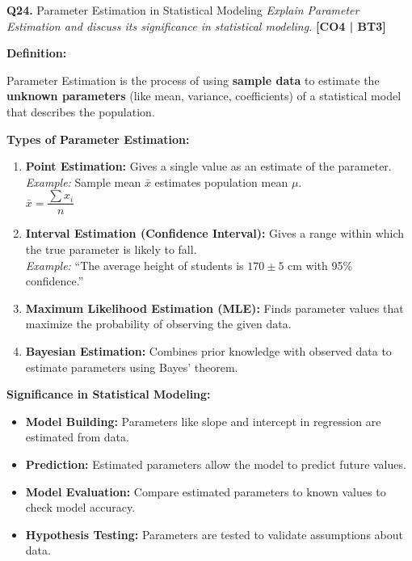\documentclass[12pt,a4paper]{article}
\newcommand{\Qno}[1]{\textbf{\color{darkred}Q#1.}}
\newcommand{\term}[1]{\textbf{\color{headingcolor}#1}}
\begin{document}
\vspace{8pt}

\begin{questionbox}{\Qno{24} Parameter Estimation in Statistical Modeling}
\textit{Explain Parameter Estimation and discuss its significance in statistical modeling.} \hfill \textbf{[CO4 | BT3]}
\end{questionbox}

\begin{answerenv}

\textbf{\color{headingcolor}Definition:}

Parameter Estimation is the process of using \textbf{sample data} to estimate the \textbf{unknown parameters} (like mean, variance, coefficients) of a statistical model that describes the population.

\vspace{6pt}
\textbf{\color{headingcolor}Types of Parameter Estimation:}

\begin{enumerate}[leftmargin=1.8em, itemsep=5pt]
  \item \term{Point Estimation:} Gives a single value as an estimate of the parameter.\\
  \textit{Example:} Sample mean $\bar{x}$ estimates population mean $\mu$.\\
  $\bar{x} = \dfrac{\sum x_i}{n}$

  \item \term{Interval Estimation (Confidence Interval):} Gives a range within which the true parameter is likely to fall.\\
  \textit{Example:} ``The average height of students is $170 \pm 5$ cm with 95\% confidence.''

  \item \term{Maximum Likelihood Estimation (MLE):} Finds parameter values that maximize the probability of observing the given data.

  \item \term{Bayesian Estimation:} Combines prior knowledge with observed data to estimate parameters using Bayes' theorem.
\end{enumerate}

\vspace{6pt}
\textbf{\color{headingcolor}Significance in Statistical Modeling:}
\begin{itemize}[leftmargin=1.5em, itemsep=3pt]
  \item \term{Model Building:} Parameters like slope and intercept in regression are estimated from data.
  \item \term{Prediction:} Estimated parameters allow the model to predict future values.
  \item \term{Model Evaluation:} Compare estimated parameters to known values to check model accuracy.
  \item \term{Hypothesis Testing:} Parameters are tested to validate assumptions about data.
\end{itemize}

\end{answerenv}
\end{document}
